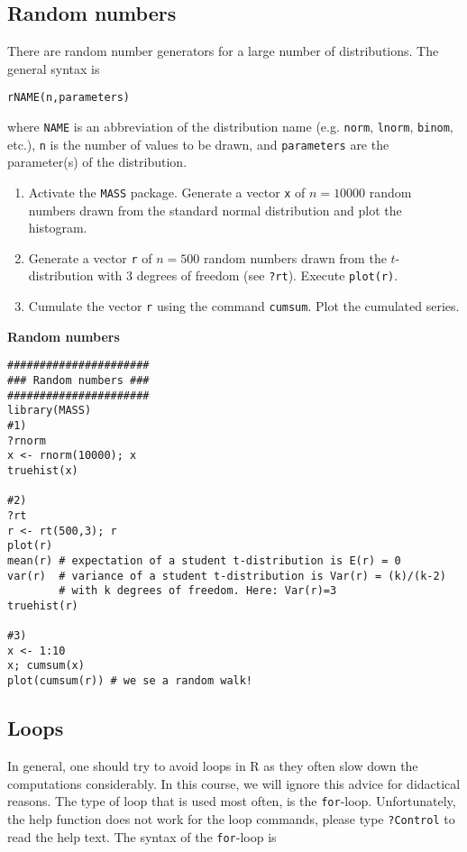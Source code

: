 \documentclass{article}
\begin{document}
\subsection{Random numbers}

There are random number generators for a large number of distributions. The general syntax is

\texttt{rNAME(n,parameters)}

where \texttt{NAME} is an abbreviation of the distribution name (e.g. \texttt{norm}, \texttt{lnorm}, \texttt{binom}, etc.), \texttt{n} is the number of values to be drawn, and \texttt{parameters} are the parameter(s) of the distribution.

\begin{enumerate}
\item Activate the \texttt{MASS} package. Generate a vector \texttt{x} of $n=10000$ random numbers drawn from the standard normal distribution and plot the histogram.

\item Generate a vector \texttt{r} of $n=500$ random numbers drawn from the $t$-distribution with 3 degrees of freedom (see \texttt{?rt}). Execute \texttt{plot(r)}.

\item Cumulate the vector \texttt{r} using the command \texttt{cumsum}. Plot the cumulated series.
\end{enumerate}

\begin{solution}
\textbf{Random numbers }

\begin{verbatim}
######################
### Random numbers ###
######################
library(MASS)
#1)
?rnorm
x <- rnorm(10000); x
truehist(x)

#2)
?rt
r <- rt(500,3); r
plot(r)
mean(r) # expectation of a student t-distribution is E(r) = 0
var(r)  # variance of a student t-distribution is Var(r) = (k)/(k-2)
        # with k degrees of freedom. Here: Var(r)=3
truehist(r)

#3)
x <- 1:10
x; cumsum(x)
plot(cumsum(r)) # we se a random walk!
\end{verbatim}
\end{solution}

\subsection{Loops}

In general, one should try to avoid loops in R as they often slow down the computations considerably. In this course, we will ignore this advice for didactical reasons. The type of loop that is used most often, is the \texttt{for}-loop. Unfortunately, the help function does not work for the loop commands, please type \texttt{?Control} to read the help text. The syntax of the \texttt{for}-loop is
\end{document}
